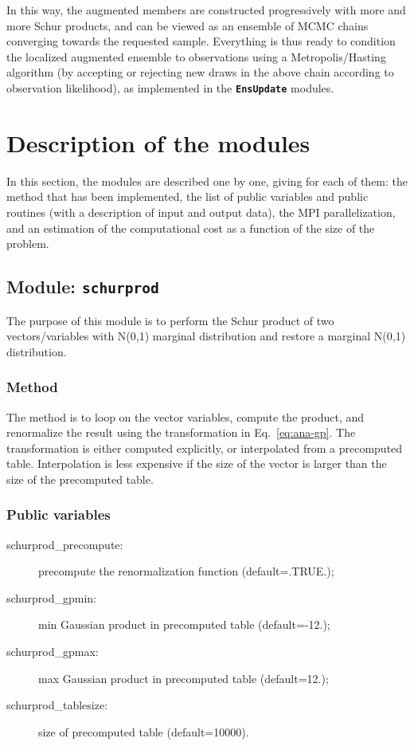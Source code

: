 \documentclass[11pt]{article}
\begin{document}
\noindent
In this way, the augmented members are constructed progressively with more and more Schur products,
and can be viewed as an ensemble of MCMC chains converging towards the requested sample.
Everything is thus ready to condition the localized augmented ensemble to observations
using a Metropolis/Hasting algorithm
(by accepting or rejecting new draws in the above chain
according to observation likelihood),
as implemented in the {\bf\tt EnsUpdate} modules.

\section{Description of the modules}

In this section,
the modules are described one by one,
giving for each of them:
the method that has been implemented,
the list of public variables and public routines
(with a description of input and output data),
the MPI parallelization, and
an estimation of the computational cost
as a function of the size of the problem.

\subsection{Module: {\tt\bf schurprod}}

The purpose of this module is to perform
the Schur product of two vectors/variables with N(0,1) marginal distribution
and restore a marginal N(0,1) distribution.

\subsubsection*{Method}

The method is to loop on the vector variables, compute the product,
and renormalize the result using the transformation in Eq.~\ref{eq:ana-gp}.
The transformation is either computed explicitly,
or interpolated from a precomputed table.
Interpolation is less expensive if the size of the vector
is larger than the size of the precomputed table.

\subsubsection*{Public variables}

\begin{description}
\item[schurprod\_precompute:] precompute the renormalization function (default=.TRUE.);
\item[schurprod\_gpmin:] min Gaussian product in precomputed table (default=-12.);
\item[schurprod\_gpmax:] max Gaussian product in precomputed table (default=12.);
\item[schurprod\_tablesize:] size of precomputed table (default=10000).
\end{description}
\end{document}
